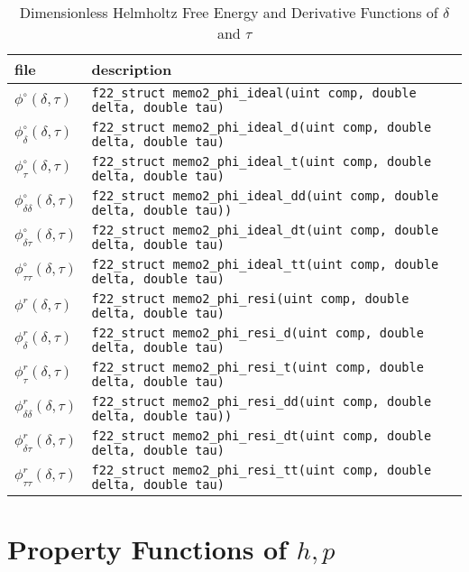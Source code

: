 \documentclass[oneside]{book}
\begin{document}
\begin{table}[h!]
\centering
\caption{Dimensionless Helmholtz Free Energy and Derivative Functions of $\delta$ and $\tau$}
\begin{tabular}{ l l }
\hline
file & description \\
\hline
\hline
$\phi^\circ(\delta, \tau)$ & \texttt{f22\_struct memo2\_phi\_ideal(uint comp, double delta, double tau)}  \\ [1ex]
$\phi^\circ_\delta(\delta, \tau)$ & \texttt{f22\_struct memo2\_phi\_ideal\_d(uint comp, double delta, double tau)}  \\ [1ex]
$\phi^\circ_\tau(\delta, \tau)$ & \texttt{f22\_struct memo2\_phi\_ideal\_t(uint comp, double delta, double tau)}  \\ [1ex]
$\phi^\circ_{\delta\delta}(\delta, \tau)$ & \texttt{f22\_struct memo2\_phi\_ideal\_dd(uint comp, double delta, double tau))}  \\ [1ex]
$\phi^\circ_{\delta\tau}(\delta, \tau)$ & \texttt{f22\_struct memo2\_phi\_ideal\_dt(uint comp, double delta, double tau)}   \\ [1ex]
$\phi^\circ_{\tau\tau}(\delta, \tau)$ & \texttt{f22\_struct memo2\_phi\_ideal\_tt(uint comp, double delta, double tau)}  \\ [1ex]
$\phi^r(\delta, \tau)$ & \texttt{f22\_struct memo2\_phi\_resi(uint comp, double delta, double tau)}  \\ [1ex]
$\phi^r_\delta(\delta, \tau)$ & \texttt{f22\_struct memo2\_phi\_resi\_d(uint comp, double delta, double tau)}  \\ [1ex]
$\phi^r_\tau(\delta, \tau)$ & \texttt{f22\_struct memo2\_phi\_resi\_t(uint comp, double delta, double tau)}  \\ [1ex]
$\phi^r_{\delta\delta}(\delta, \tau)$ & \texttt{f22\_struct memo2\_phi\_resi\_dd(uint comp, double delta, double tau))}  \\ [1ex]
$\phi^r_{\delta\tau}(\delta, \tau)$ & \texttt{f22\_struct memo2\_phi\_resi\_dt(uint comp, double delta, double tau)}   \\ [1ex]
$\phi^r_{\tau\tau}(\delta, \tau)$ & \texttt{f22\_struct memo2\_phi\_resi\_tt(uint comp, double delta, double tau)}  \\ [1ex]
 \hline    
\end{tabular}
\label{table:props_dt_phi}
\end{table}

\section{Property Functions of $h, p$}
\end{document}

